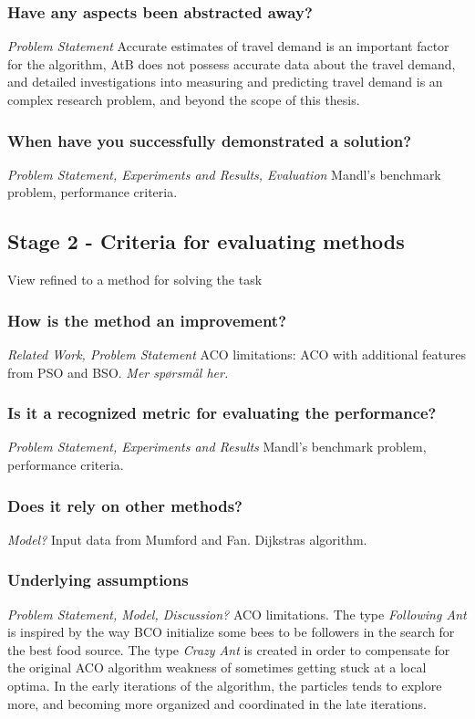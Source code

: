 \subsubsection{Have any aspects been abstracted away?}
\emph{\color{orange} Problem Statement}
Accurate estimates of travel demand is an important factor for the algorithm, AtB does not possess accurate data about the travel demand, and detailed investigations into measuring and predicting travel demand is an complex research problem, and beyond the scope of this thesis. 

\subsubsection{When have you successfully demonstrated a solution?}
\emph{\color{orange} Problem Statement, Experiments and Results, Evaluation}
Mandl's benchmark problem, performance criteria.

\subsection{Stage 2 - Criteria for evaluating methods}
View refined to a method for solving the task
\subsubsection{How is the method an improvement?}
\emph{\color{orange} Related Work, Problem Statement}
ACO limitations: ACO with additional features from PSO and BSO. 
\emph{\color{blue} Mer spørsmål her.}

\subsubsection{Is it a recognized metric for evaluating the performance?}
\emph{\color{orange} Problem Statement, Experiments and Results}
Mandl's benchmark problem, performance criteria.

\subsubsection{Does it rely on other methods?}
\emph{\color{orange} Model?}
Input data from Mumford and Fan. Dijkstras algorithm.

\subsubsection{Underlying assumptions}
\emph{\color{orange} Problem Statement, Model, Discussion?}
ACO limitations. The type \textit{Following Ant} is inspired by the way BCO initialize some bees to be followers in the search for the best food source. The type \textit{Crazy Ant} is created in order to compensate for the original ACO algorithm weakness of sometimes getting stuck at a local optima. In the early iterations of the algorithm, the particles tends to explore more, and becoming more organized and coordinated in the late iterations.

